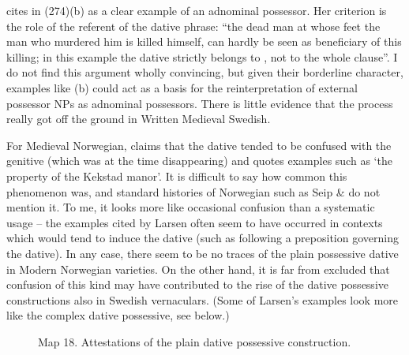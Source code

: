 
\citet[212]{Norde1997} cites in (274)(b) as a clear example of an adnominal possessor. Her criterion is the role of the referent of the dative phrase: “the dead man at whose feet the man who murdered him is killed himself, can hardly be seen as beneficiary of this killing; in this example the dative  strictly belongs to , not to the whole clause”. I do not find this argument wholly convincing, but given their borderline character, examples like (b) could act as a basis for the reinterpretation of external possessor NPs as adnominal possessors. There is little evidence that the process really got off the ground in Written Medieval Swedish.


For Medieval Norwegian, \citet{Larsen1895} claims that the dative tended to be confused with the genitive (which was at the time disappearing) and quotes examples such as  ‘the property of the Kekstad manor’. It is difficult to say how common this phenomenon was, and standard histories of Norwegian such as Seip \& \citet{Saltveit1971} do not mention it. To me, it looks more like occasional confusion than a systematic usage – the examples cited by Larsen often seem to have occurred in contexts which would tend to induce the dative (such as following a preposition governing the dative). In any case, there seem to be no traces of the plain possessive dative in Modern Norwegian varieties. On the other hand, it is far from excluded that confusion of this kind may have contributed to the rise of the dative possessive constructions also in Swedish vernaculars. (Some of Larsen’s examples look more like the complex dative possessive, see below.)




\begin{figure}[h]



\label{bkm:Ref154557005}Map 18. Attestations of the plain dative possessive construction.




\end{figure}

